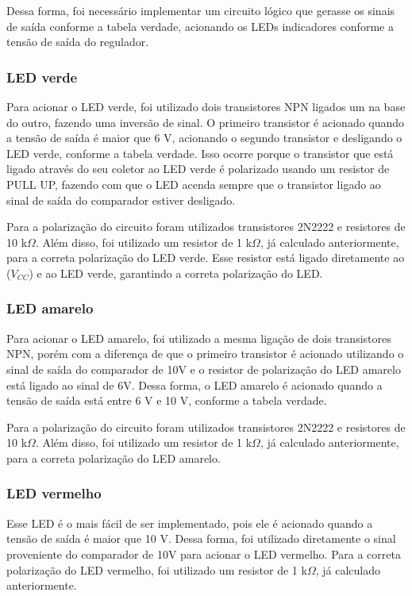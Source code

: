 Dessa forma, foi necessário implementar um circuito lógico que gerasse os sinais de saída conforme a tabela verdade, acionando os LEDs indicadores conforme a tensão de saída do regulador.

\subsubsection*{LED verde}

Para acionar o LED verde, foi utilizado dois transistores NPN ligados um na base do outro, fazendo uma inversão de sinal. O primeiro transistor é acionado quando a tensão de saída é maior que 6 V, acionando o segundo transistor e desligando o LED verde, conforme a tabela verdade. Isso ocorre porque o transistor que está ligado através do seu coletor ao LED verde é polarizado usando um resistor de PULL UP, fazendo com que o LED acenda sempre que o transistor ligado ao sinal de saída do comparador estiver desligado. 

Para a polarização do circuito foram utilizados transistores 2N2222 e resistores de 10 k\(\Omega\). Além disso, foi utilizado um resistor de 1 k\(\Omega\), já calculado anteriormente, para a correta polarização do LED verde. Esse resistor está ligado diretamente ao (\(V_{CC}\)) e ao LED verde, garantindo a correta polarização do LED.

\subsubsection*{LED amarelo}

Para acionar o LED amarelo, foi utilizado a mesma ligação de dois transistores NPN, porém com a diferença de que o primeiro transistor é acionado utilizando o sinal de saída do comparador de 10V e o resistor de polarização do LED amarelo está ligado ao sinal de 6V. Dessa forma, o LED amarelo é acionado quando a tensão de saída está entre 6 V e 10 V, conforme a tabela verdade.

Para a polarização do circuito foram utilizados transistores 2N2222 e resistores de 10 k\(\Omega\). Além disso, foi utilizado um resistor de 1 k\(\Omega\), já calculado anteriormente, para a correta polarização do LED amarelo. 

\subsubsection*{LED vermelho}

Esse LED é o mais fácil de ser implementado, pois ele é acionado quando a tensão de saída é maior que 10 V. Dessa forma, foi utilizado diretamente o sinal proveniente do comparador de 10V para acionar o LED vermelho. Para a correta polarização do LED vermelho, foi utilizado um resistor de 1 k\(\Omega\), já calculado anteriormente.

